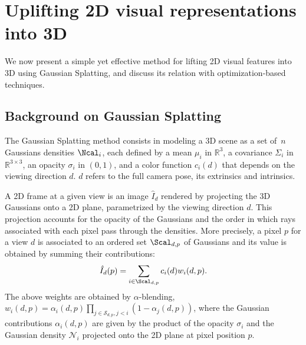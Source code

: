 \section{Uplifting 2D visual representations into 3D}
\label{sec:method_uplifting}

We now present a simple yet effective method for lifting 2D visual features into 3D using Gaussian Splatting, and discuss its relation with optimization-based techniques.

\subsection{Background on Gaussian Splatting}
\label{sec:background}

The Gaussian Splatting method consists in modeling a 3D scene as a set of~$n$ Gaussians densities $\Ncal_i$, each defined by a mean $\mu_i$ in $\mathbb{R}^3$, a covariance $\Sigma_i$ in $\mathbb{R}^{3\times 3}$, an opacity $\sigma_i$ in $(0,1)$, and a color function $c_i({d})$ that depends on the viewing direction $d$.
$d$ refers to the full camera pose, \ie its extrinsics and intrinsics.

A 2D frame at a given view is an image $\hat{I}_d$ rendered by projecting the 3D Gaussians onto a 2D plane, parametrized by the viewing direction $d$. This projection accounts for the opacity of the Gaussians and the order in which rays associated with each pixel pass through the densities.
More precisely, a pixel $p$ for a view $d$ is associated to an ordered set $\Scal_{{d},p}$ of Gaussians and its value is obtained by summing their contributions:
\vspace{-.07cm}
\begin{equation}\label{eq:render}
\hat{I}_{{d}}(p) = \sum_{i \in \Scal_{d,p}} c_i(d) w_{i}(d, p). 
\end{equation}
\vspace{-.07cm}
The above weights are obtained by $\alpha$-blending, \ie $w_{i}(d, p) = \alpha_{i}(d,p) \prod_{j\in \mathcal{S}_{d,p}, j<i} \left(1-\alpha_{j}(d,p)\right)$, 
where the Gaussian contributions $\alpha_{i}(d,p)$ are given by the product of the opacity $\sigma_i$ and the Gaussian density $\mathcal{N}_i$ projected onto the 2D plane at pixel position $p$.

